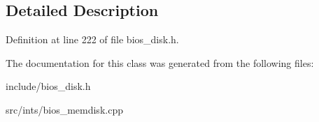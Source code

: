 \subsection{Detailed Description}


Definition at line 222 of file bios\-\_\-disk.\-h.



The documentation for this class was generated from the following files\-:\begin{DoxyCompactItemize}
\item 
include/bios\-\_\-disk.\-h\item 
src/ints/bios\-\_\-memdisk.\-cpp\end{DoxyCompactItemize}

